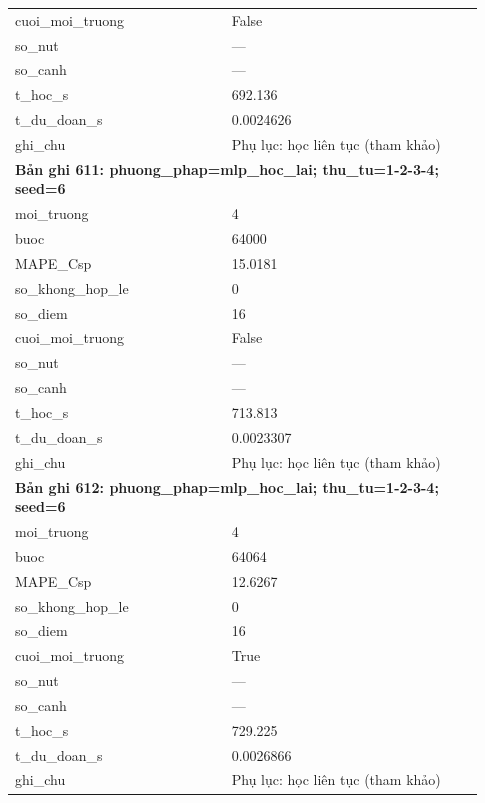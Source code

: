 \begin{longtable}{p{0.43\linewidth}p{0.50\linewidth}}
cuoi\_\allowbreak moi\_\allowbreak truong & False \\
so\_\allowbreak nut & — \\
so\_\allowbreak canh & — \\
t\_\allowbreak hoc\_\allowbreak s & 692.136 \\
t\_\allowbreak du\_\allowbreak doan\_\allowbreak s & 0.0024626 \\
ghi\_\allowbreak chu & Phụ lục: học liên tục (tham khảo) \\
\midrule
\multicolumn{2}{p{0.95\linewidth}}{\textbf{Bản ghi 611: phuong\_phap=mlp\_hoc\_lai; thu\_tu=1-2-3-4; seed=6}} \\
moi\_\allowbreak truong & 4 \\
buoc & 64000 \\
MAPE\_\allowbreak Csp & 15.0181 \\
so\_\allowbreak khong\_\allowbreak hop\_\allowbreak le & 0 \\
so\_\allowbreak diem & 16 \\
cuoi\_\allowbreak moi\_\allowbreak truong & False \\
so\_\allowbreak nut & — \\
so\_\allowbreak canh & — \\
t\_\allowbreak hoc\_\allowbreak s & 713.813 \\
t\_\allowbreak du\_\allowbreak doan\_\allowbreak s & 0.0023307 \\
ghi\_\allowbreak chu & Phụ lục: học liên tục (tham khảo) \\
\midrule
\multicolumn{2}{p{0.95\linewidth}}{\textbf{Bản ghi 612: phuong\_phap=mlp\_hoc\_lai; thu\_tu=1-2-3-4; seed=6}} \\
moi\_\allowbreak truong & 4 \\
buoc & 64064 \\
MAPE\_\allowbreak Csp & 12.6267 \\
so\_\allowbreak khong\_\allowbreak hop\_\allowbreak le & 0 \\
so\_\allowbreak diem & 16 \\
cuoi\_\allowbreak moi\_\allowbreak truong & True \\
so\_\allowbreak nut & — \\
so\_\allowbreak canh & — \\
t\_\allowbreak hoc\_\allowbreak s & 729.225 \\
t\_\allowbreak du\_\allowbreak doan\_\allowbreak s & 0.0026866 \\
ghi\_\allowbreak chu & Phụ lục: học liên tục (tham khảo) \\

\end{longtable}
